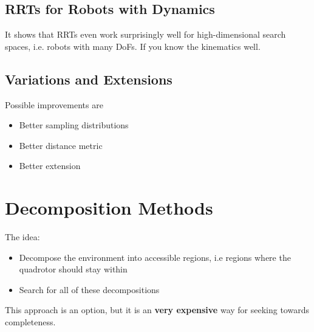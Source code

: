 \subsection{RRTs for Robots with Dynamics}
It shows that RRTs even work surprisingly well for high-dimensional search spaces, i.e. robots with many DoFs. If you know the kinematics well. 


\subsection{Variations and Extensions}
Possible improvements are
\begin{itemize}
\item Better sampling distributions
\item Better distance metric
\item Better extension 
\end{itemize}


\section{Decomposition Methods}
The idea:
\begin{itemize}
\item Decompose the environment into accessible regions, i.e regions where the quadrotor should stay within
\item Search for all of these decompositions
\end{itemize}
This approach is an option, but it is an \textbf{very expensive} way for seeking towards completeness. 